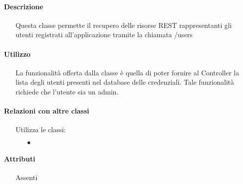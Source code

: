\paragraph*{Descrizione}
\begin{itemize}
\item[] Questa classe permette il recupero delle risorse REST rappresentanti gli utenti registrati all'applicazione tramite la chiamata /users
\end{itemize}

\paragraph*{Utilizzo}
\begin{itemize}
\item[] La funzionalità offerta dalla classe è quella di poter fornire al Controller la lista degli utenti presenti nel database delle credenziali.
Tale funzionalità richiede che l'utente sia un admin.
\end{itemize}

\paragraph*{Relazioni con altre classi}
\begin{itemize}


\item[] Utilizza le classi:
\begin{itemize}
\item[$\bullet$] 
\end{itemize}
\end{itemize}

\paragraph*{Attributi}
\begin{itemize}
\item[] Assenti
\end{itemize}

